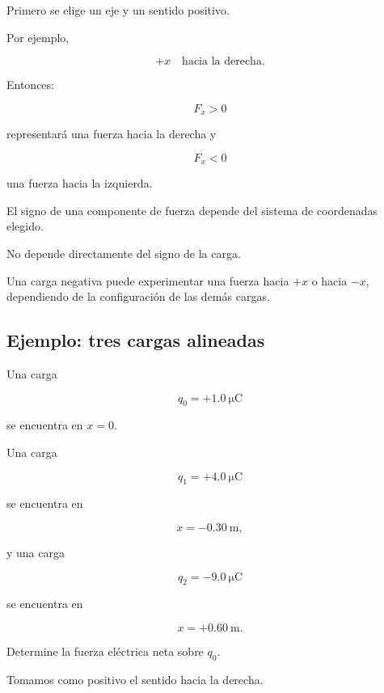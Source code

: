 Primero se elige un eje y un sentido positivo.

Por ejemplo,

\[
+x
\quad\text{hacia la derecha}.
\]

Entonces:

\[
F_x>0
\]

representará una fuerza hacia la derecha y

\[
F_x<0
\]

una fuerza hacia la izquierda.

\begin{advertencia}

El signo de una componente de fuerza depende del sistema de coordenadas
elegido.

No depende directamente del signo de la carga.

Una carga negativa puede experimentar una fuerza hacia \(+x\) o hacia
\(-x\), dependiendo de la configuración de las demás cargas.

\end{advertencia}



\subsection{Ejemplo: tres cargas alineadas}

\begin{ejemplo}

Una carga

\[
q_0=+\SI{1.0}{\micro\coulomb}
\]

se encuentra en \(x=0\).

Una carga

\[
q_1=+\SI{4.0}{\micro\coulomb}
\]

se encuentra en

\[
x=-\SI{0.30}{\metre},
\]

y una carga

\[
q_2=-\SI{9.0}{\micro\coulomb}
\]

se encuentra en

\[
x=+\SI{0.60}{\metre}.
\]

Determine la fuerza eléctrica neta sobre \(q_0\).

\end{ejemplo}

Tomamos como positivo el sentido hacia la derecha.


